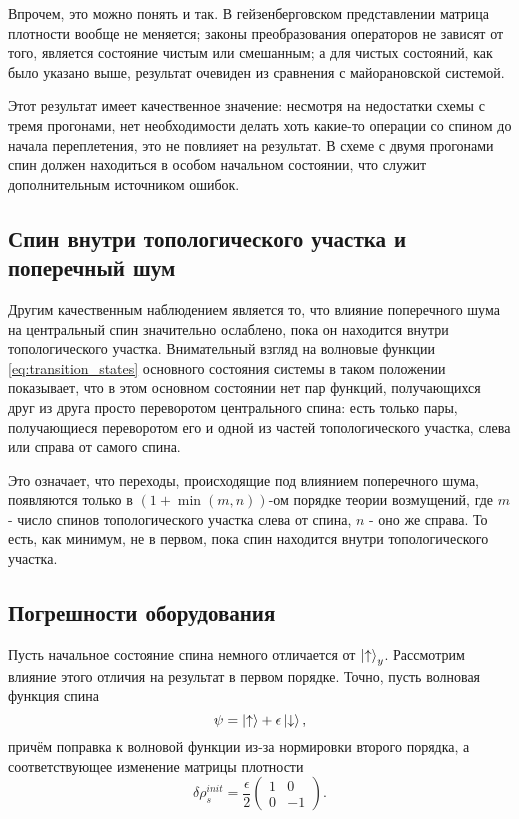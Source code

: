 \documentclass[a4paper,12pt]{article}
\theoremstyle{plain} %
\theoremstyle{definition} %
\theoremstyle{remark} %
\begin{document}
Впрочем, это можно понять и так. В гейзенберговском представлении матрица плотности вообще не меняется; законы преобразования операторов не зависят от того, является состояние чистым или смешанным; а для чистых состояний, как было указано выше, результат очевиден из сравнения с майорановской системой.

Этот результат имеет качественное значение: несмотря на недостатки схемы с тремя прогонами, нет необходимости делать хоть какие-то операции со спином до начала переплетения, это не повлияет на результат. 
В схеме с двумя прогонами спин должен находиться в особом начальном состоянии, что служит дополнительным источником ошибок.

\subsection{Спин внутри топологического участка и поперечный шум}

Другим качественным наблюдением является то, что влияние поперечного шума на центральный спин значительно ослаблено, пока он находится внутри топологического участка. 
Внимательный взгляд на волновые функции \ref{eq:transition_states} основного состояния системы в таком положении показывает, что в этом основном состоянии нет пар функций, получающихся друг из друга просто переворотом центрального спина: есть только пары, получающиеся переворотом его и одной из частей топологического участка, слева или справа от самого спина.

Это означает, что переходы, происходящие под влиянием поперечного шума, появляются только в $(1 + \min(m,n))$-ом порядке теории возмущений, где $m$ - число спинов топологического участка слева от спина, $n$ - оно же справа. 
То есть, как минимум, не в первом, пока спин находится внутри топологического участка.

\subsection{Погрешности оборудования}

Пусть начальное состояние спина немного отличается от $\ket{\uparrow}_y$. Рассмотрим влияние этого отличия на результат в первом порядке. 
Точно, пусть волновая функция спина
\begin{equation}
    \psi = \ket{\uparrow} + \epsilon \ket{\downarrow},
\end{equation}
причём поправка к волновой функции из-за нормировки второго порядка, а соответствующее изменение матрицы плотности
\begin{equation}
    \delta\rho^{init}_s = \frac{\epsilon}{2}
    \begin{pmatrix}
        1 & 0 \\
        0 & -1 
    \end{pmatrix}.
\end{equation}
\end{document}
